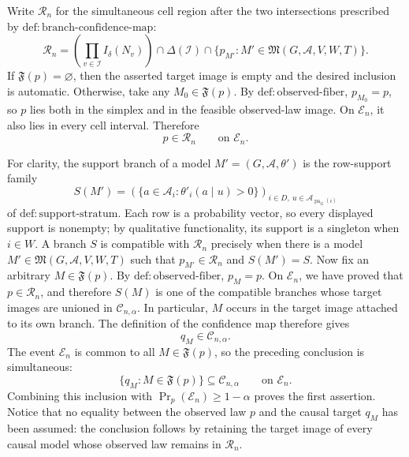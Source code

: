 Write \(\mathcal R_n\) for the simultaneous cell region after the two intersections prescribed by \(\mathrm{def:branch\text{-}confidence\text{-}map}\):
\[
 \mathcal R_n=
 \left(\prod_{v\in\mathcal I}I_\delta(N_v)\right)
 \cap\Delta(\mathcal I)
 \cap\{p_{M'}:M'\in\mathfrak M(G,\mathcal A,V,W,T)\}.
\]
If \(\mathfrak F(p)=\varnothing\), then the asserted target image is empty and the desired inclusion is automatic.  Otherwise, take any \(M_0\in\mathfrak F(p)\).  By \(\mathrm{def:observed\text{-}fiber}\), \(p_{M_0}=p\), so \(p\) lies both in the simplex and in the feasible observed-law image.  On \(\mathcal E_n\), it also lies in every cell interval.  Therefore
\[
 p\in\mathcal R_n \qquad\text{on }\mathcal E_n.
\]

For clarity, the support branch of a model \(M'=(G,\mathcal A,\theta')\) is the row-support family
\[
 S(M')=\left(\{a\in\mathcal A_i:\theta'_i(a\mid u)>0\}\right)_{i\in D,\ u\in\mathcal A_{\operatorname{pa}_G(i)}}
\]
of \(\mathrm{def:support\text{-}stratum}\).  Each row is a probability vector, so every displayed support is nonempty; by qualitative functionality, its support is a singleton when \(i\in W\).  A branch \(S\) is compatible with \(\mathcal R_n\) precisely when there is a model \(M'\in\mathfrak M(G,\mathcal A,V,W,T)\) such that \(p_{M'}\in\mathcal R_n\) and \(S(M')=S\).  Now fix an arbitrary \(M\in\mathfrak F(p)\).  By \(\mathrm{def:observed\text{-}fiber}\), \(p_M=p\).  On \(\mathcal E_n\), we have proved that \(p\in\mathcal R_n\), and therefore \(S(M)\) is one of the compatible branches whose target images are unioned in \(\mathcal C_{n,\alpha}\).  In particular, \(M\) occurs in the target image attached to its own branch.  The definition of the confidence map therefore gives
\[
 q_M\in\mathcal C_{n,\alpha}.
\]
The event \(\mathcal E_n\) is common to all \(M\in\mathfrak F(p)\), so the preceding conclusion is simultaneous:
\[
 \{q_M:M\in\mathfrak F(p)\}
 \subseteq\mathcal C_{n,\alpha}
 \qquad\text{on }\mathcal E_n.
\]
Combining this inclusion with \(\Pr_p(\mathcal E_n)\geq1-\alpha\) proves the first assertion.  Notice that no equality between the observed law \(p\) and the causal target \(q_M\) has been assumed: the conclusion follows by retaining the target image of every causal model whose observed law remains in \(\mathcal R_n\).

